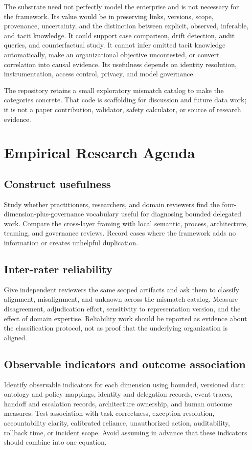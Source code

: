 \documentclass[11pt,letterpaper]{article}
\begin{document}
The substrate need not perfectly model the enterprise and is not necessary for the framework. Its value would be in preserving links, versions, scope, provenance, uncertainty, and the distinction between explicit, observed, inferable, and tacit knowledge. It could support case comparison, drift detection, audit queries, and counterfactual study. It cannot infer omitted tacit knowledge automatically, make an organizational objective uncontested, or convert correlation into causal evidence. Its usefulness depends on identity resolution, instrumentation, access control, privacy, and model governance.

The repository retains a small exploratory mismatch catalog to make the categories concrete. That code is scaffolding for discussion and future data work; it is not a paper contribution, validator, safety calculator, or source of research evidence.

\section{Empirical Research Agenda}
\subsection{Construct usefulness}
Study whether practitioners, researchers, and domain reviewers find the four-dimension-plus-governance vocabulary useful for diagnosing bounded delegated work. Compare the cross-layer framing with local semantic, process, architecture, teaming, and governance reviews. Record cases where the framework adds no information or creates unhelpful duplication.

\subsection{Inter-rater reliability}
Give independent reviewers the same scoped artifacts and ask them to classify alignment, misalignment, and unknown across the mismatch catalog. Measure disagreement, adjudication effort, sensitivity to representation version, and the effect of domain expertise. Reliability work should be reported as evidence about the classification protocol, not as proof that the underlying organization is aligned.

\subsection{Observable indicators and outcome association}
Identify observable indicators for each dimension using bounded, versioned data: ontology and policy mappings, identity and delegation records, event traces, handoff and escalation records, architecture ownership, and human outcome measures. Test association with task correctness, exception resolution, accountability clarity, calibrated reliance, unauthorized action, auditability, rollback time, or incident scope. Avoid assuming in advance that these indicators should combine into one equation.
\end{document}
